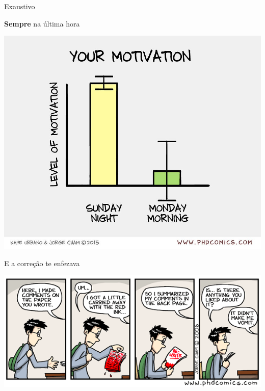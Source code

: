 \documentclass{beamer}
\begin{document}
\begin{frame}
  \begin{center}
    Exaustivo

    \vfill
  \end{center}
\end{frame}

\begin{frame}{{\bf Sempre} na última hora}
  \begin{center}
    \includegraphics[height=.75\textheight]{Encerramento/phdcomics-motivation}

    \vfill
  \end{center}
\end{frame}

\begin{frame}{E a correção te enfezava}
  \begin{center}
    \includegraphics[width=\textwidth]{Encerramento/phdcomics-correcao}

    \vfill
  \end{center}
\end{frame}
\end{document}
